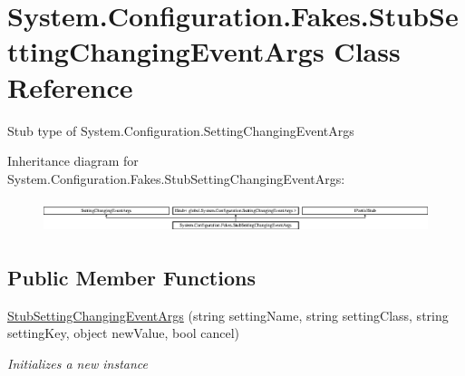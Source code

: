 \hypertarget{class_system_1_1_configuration_1_1_fakes_1_1_stub_setting_changing_event_args}{\section{System.\-Configuration.\-Fakes.\-Stub\-Setting\-Changing\-Event\-Args Class Reference}
\label{class_system_1_1_configuration_1_1_fakes_1_1_stub_setting_changing_event_args}
}


Stub type of System.\-Configuration.\-Setting\-Changing\-Event\-Args 


Inheritance diagram for System.\-Configuration.\-Fakes.\-Stub\-Setting\-Changing\-Event\-Args\-:\begin{figure}[H]
\begin{center}
\leavevmode
\includegraphics[height=0.969697cm]{class_system_1_1_configuration_1_1_fakes_1_1_stub_setting_changing_event_args}
\end{center}
\end{figure}
\subsection*{Public Member Functions}
\begin{DoxyCompactItemize}
\item 
\hyperlink{class_system_1_1_configuration_1_1_fakes_1_1_stub_setting_changing_event_args_aa34933c0e65a558a2d117135af1e83e9}{Stub\-Setting\-Changing\-Event\-Args} (string setting\-Name, string setting\-Class, string setting\-Key, object new\-Value, bool cancel)
\begin{DoxyCompactList}\small\item\em Initializes a new instance\end{DoxyCompactList}\end{DoxyCompactItemize}
